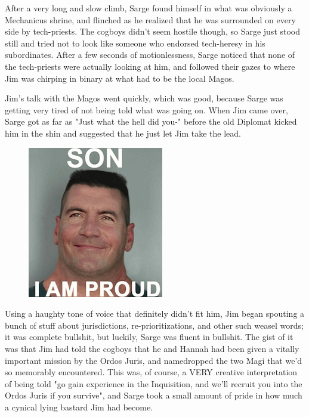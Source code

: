 After a very long and slow climb, Sarge found himself in what was obviously a Mechanicus shrine, and flinched as he realized that he was surrounded on every side by tech-priests. 
The cogboys didn't seem hostile though, so Sarge just stood still and tried not to look like someone who endorsed tech-heresy in his subordinates. 
After a few seconds of motionlessness, Sarge noticed that none of the tech-priests were actually looking at him, and followed their gazes to where Jim was chirping in binary at what had to be the local Magos.

Jim's talk with the Magos went quickly, which was good, because Sarge was getting very tired of not being told what was going on. 
When Jim came over, Sarge got as far as "Just what the hell did you-" before the old Diplomat kicked him in the shin and suggested that he just let Jim take the lead. 


\begin{figure}
	\begin{center}
		\includegraphics[width=\figwidth]{pics/14/42.png}
	\end{center}
\end{figure}
Using a haughty tone of voice that definitely didn't fit him, Jim began spouting a bunch of stuff about jurisdictions, re-prioritizations, and other such weasel words; 
it was complete bullshit, but luckily, Sarge was fluent in bullshit. 
The gist of it was that Jim had told the cogboys that he and Hannah had been given a vitally important mission by the Ordos Juris, and namedropped the two Magi that we'd so memorably encountered. 
This was, of course, a VERY creative interpretation of being told "go gain experience in the Inquisition, and we'll recruit you into the Ordos Juris if you survive", and Sarge took a small amount of pride in how much a cynical lying bastard Jim had become.

